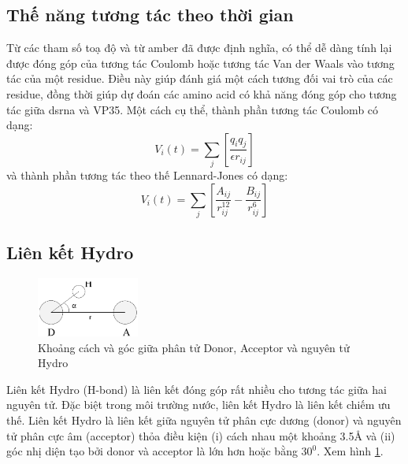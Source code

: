\documentclass[12pt,a4paper,reqno, oneside]{book}
\begin{document}
	\subsection{Thế năng tương tác theo thời gian}
	
	Từ các tham số toạ độ và từ \gls{amber} đã được định nghĩa, có thể dễ dàng tính lại được đóng góp của tương tác Coulomb hoặc tương tác Van der Waals vào tương tác của một \gls{residue}. Điều này giúp đánh giá một cách tương đối vai trò của các \gls{residue}, đồng thời giúp dự đoán các amino acid có khả năng đóng góp cho tương tác giữa \gls{dsrna} và VP35.
	Một cách cụ thể, thành phần tương tác Coulomb có dạng:
	\begin{equation}
	V_{i}\left(t\right) = \sum_{j}\left[\dfrac{q_{i} q_{j}}{\epsilon r_{ij}}\right]
	\end{equation}
	và thành phần tương tác theo thế Lennard-Jones có dạng:
	\begin{equation}
	V_{i}\left(t\right) = \sum_{j}\left[\dfrac{A_{ij}}{r_{ij}^{12}}-\dfrac{B_{ij}}{r_{ij}^{6}}\right]
	\end{equation}
	\subsection{Liên kết Hydro}
	\begin{figure}[h]
	\centering
	\includegraphics[width=0.3\textwidth,natwidth=610,natheight=642]{hbond}
	\caption{Khoảng cách và góc giữa phân tử Donor, Acceptor và nguyên tử Hydro}
	\label{fig:hbond_angle}
	\end{figure}
	Liên kết Hydro (H-bond) là liên kết đóng góp rất nhiều cho tương tác giữa hai nguyên tử. Đặc biệt trong môi trường nước, liên kết Hydro là liên kết chiếm ưu thế.
	Liên kết Hydro là liên kết giữa nguyên tử phân cực dương (donor) và nguyên tử phân cực âm (acceptor) thỏa điều kiện (i) cách nhau một khoảng 3.5\AA{} và (ii) góc nhị diện tạo bởi donor và acceptor là lớn hơn hoặc bằng $ 30^{0} $. Xem hình \ref{fig:hbond_angle}.
\end{document}
